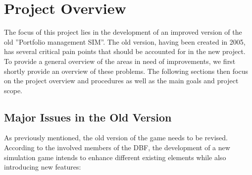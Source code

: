 \section{Project Overview}
\label{sec:project_overview}

The focus of this project lies in the development of an improved version of the old ''Portfolio management SIM''. The old version, having been created in 2005, has several critical pain points that should be accounted for in the new project. To provide a general overview of the areas in need of improvements, we first shortly provide an overview of these problems. The following sections then focus on the project overview and procedures as well as the main goals and project scope.

\subsection{Major Issues in the Old Version}
As previously mentioned, the old version of the game needs to be revised. According to the involved members of the DBF, the development of a new simulation game intends to enhance different existing elements while also introducing new features:

